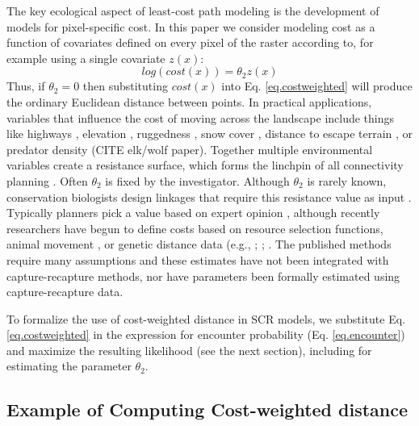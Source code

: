 \documentclass[12pt]{article}
\begin{document}
The key ecological aspect of least-cost path modeling is the
development 
of models for pixel-specific cost. 
In this paper we consider modeling cost as a function of covariates
defined on every pixel of the raster according to, for example using a
single covariate $z(x)$:
\begin{equation}
 log(cost(x))=  \theta_{2} z(x)
\label{eq.cost}
\end{equation}
Thus, if $\theta_{2} = 0$ then substituting $cost(x)$ into
Eq. \ref{eq.costweighted} will produce the ordinary Euclidean distance
between points.
In practical applications, variables that
influence the cost of moving across the landscape include things like
highways  \citep[e.g.,][]{epps_etal:2005}, elevation
\citep{cushman_etal:2006},
ruggedness \citep{epps_etal:2007}, snow cover \citep{schwartz_etal:2009},
distance to escape terrain \citep{shirk_etal:2010}, or predator density
(CITE elk/wolf paper).  Together multiple environmental variables create
a resistance surface, which forms the linchpin of all connectivity
planning \citep{spear_etal:2010}.  Often $\theta_{2}$ is fixed by the
investigator. Although
 $\theta_{2}$ is rarely known,
 conservation
biologists design linkages that require this resistance value as input
\citep{beier_etal:2008}.  Typically planners pick a value based on
expert opinion \citep{beier_etal:2007}, although recently researchers
have begun to define costs based on resource selection functions,
animal movement \citep{tracy:2006, dickenson_etal:2005}, or genetic
distance data (e.g., \citet{gerlach_musolf:2000};
\citet{epps_etal:2007}; \citet{schwartz_etal:2009}. The published
methods require many assumptions and these estimates have not been
integrated with capture-recapture methods, nor have parameters been
formally estimated using capture-recapture data.

To formalize the use of cost-weighted distance in SCR models, we
substitute Eq. \ref{eq.costweighted} in the expression for encounter
probability (Eq. \ref{eq.encounter}) and maximize the resulting
likelihood (see the next section), including for estimating the
parameter $\theta_{2}$.



\subsection{Example of Computing Cost-weighted distance}
\end{document}
